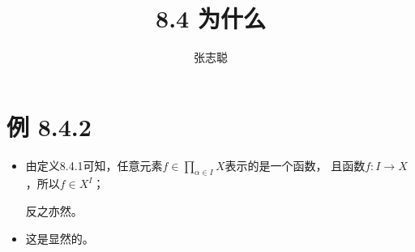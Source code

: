 \documentclass{article}
\begin{document}
\title{8.4 为什么}
\author{张志聪}
\maketitle

\section*{例 8.4.2}

\begin{itemize}
  \item 由定义8.4.1可知，任意元素$f \in \prod \limits_{\alpha \in I} X$表示的是一个函数，
        且函数$f: I \rightarrow X$，所以$f \in X^I$；

        反之亦然。

  \item 这是显然的。
\end{itemize}
\end{document}
